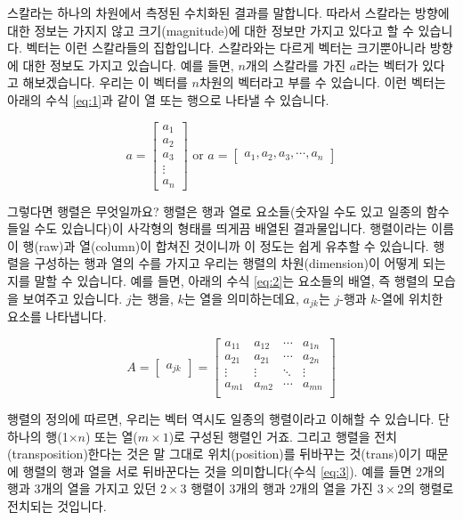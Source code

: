 \documentclass[
]{book}
\begin{document}
스칼라는 하나의 차원에서 측정된 수치화된 결과를 말합니다. 따라서 스칼라는 방향에 대한 정보는 가지지 않고 크기(magnitude)에 대한 정보만 가지고 있다고 할 수 있습니다. 벡터는 이런 스칼라들의 집합입니다. 스칼라와는 다르게 벡터는 크기뿐아니라 방향에 대한 정보도 가지고 있습니다. 예를 들면, \(n\)개의 스칼라를 가진 \(a\)라는 벡터가 있다고 해보겠습니다. 우리는 이 벡터를 \(n\)차원의 벡터라고 부를 수 있습니다. 이런 벡터는 아래의 수식 \ref{eq:1}과 같이 열 또는 행으로 나타낼 수 있습니다.

\begin{equation} \label{eq:1}
a = \begin{bmatrix}a_1 \\ a_2 \\ a_3 \\ \vdots \\ a_n\end{bmatrix} \text{ or } a = \begin{bmatrix}a_1, a_2, a_3, \cdots, a_n\end{bmatrix}
\end{equation}

그렇다면 행렬은 무엇일까요? 행렬은 행과 열로 요소들(숫자일 수도 있고 일종의 함수들일 수도 있습니다)이 사각형의 형태를 띄게끔 배열된 결과물입니다. 행렬이라는 이름이 행(raw)과 열(column)이 합쳐진 것이니까 이 정도는 쉽게 유추할 수 있습니다. 행렬을 구성하는 행과 열의 수를 가지고 우리는 행렬의 차원(dimension)이 어떻게 되는지를 말할 수 있습니다. 예를 들면, 아래의 수식 \ref{eq:2}는 요소들의 배열, 즉 행렬의 모습을 보여주고 있습니다. \(j\)는 행을, \(k\)는 열을 의미하는데요, \(a_{jk}\)는 \(j\)-행과 \(k\)-열에 위치한 요소를 나타냅니다.

\begin{equation} \label{eq:2}
A = \begin{bmatrix}a_{jk}\end{bmatrix} = 
\begin{bmatrix} 
a_{11} & a_{12} & \cdots & a_{1n} \\ 
a_{21} & a_{21} & \cdots & a_{2n} \\
\vdots & \vdots & \ddots & \vdots \\
a_{m1} & a_{m2} & \cdots & a_{mn} \\ \end{bmatrix}
\end{equation}

행렬의 정의에 따르면, 우리는 벡터 역시도 일종의 행렬이라고 이해할 수 있습니다. 단 하나의 행(1\(\times n\)) 또는 열(\(m \times1\))로 구성된 행렬인 거죠. 그리고 행렬을 전치(transposition)한다는 것은 말 그대로 위치(position)를 뒤바꾸는 것(trans)이기 때문에 행렬의 행과 열을 서로 뒤바꾼다는 것을 의미합니다(수식 \ref{eq:3}). 예를 들면 2개의 행과 3개의 열을 가지고 있던 \(2\times3\) 행렬이 3개의 행과 2개의 열을 가진 \(3\times 2\)의 행렬로 전치되는 것입니다.
\end{document}
